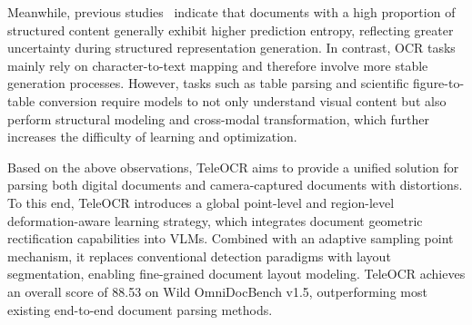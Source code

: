 \documentclass{fairmeta}
\begin{document}

Meanwhile, previous studies~\cite{zhong2025reading} indicate that documents with a high proportion of structured content generally exhibit higher prediction entropy, reflecting greater uncertainty during structured representation generation. In contrast, OCR tasks mainly rely on character-to-text mapping and therefore involve more stable generation processes. However, tasks such as table parsing and scientific figure-to-table conversion require models to not only understand visual content but also perform structural modeling and cross-modal transformation, which further increases the difficulty of learning and optimization.

Based on the above observations, TeleOCR aims to provide a unified solution for parsing both digital documents and camera-captured documents with distortions. To this end, TeleOCR introduces a global point-level and region-level deformation-aware learning strategy, which integrates document geometric rectification capabilities into VLMs. Combined with an adaptive sampling point mechanism, it replaces conventional detection paradigms with layout segmentation, enabling fine-grained document layout modeling. TeleOCR achieves an overall score of 88.53 on Wild OmniDocBench v1.5, outperforming most existing end-to-end document parsing methods.
\end{document}
